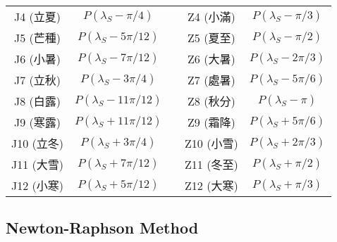 \documentclass[12pt]{article}
\begin{document}
\begin{CJK}{UTF8}{bkai}
\begin{tabular}{cc|c|cc}
  J4 (立夏) & $P(\lambda_S - \pi/4)$ & & Z4 (小滿) & $P(\lambda_S - \pi/3)$ \\
  J5 (芒種) & $P(\lambda_S - 5\pi/12)$ & & Z5 (夏至) & $P(\lambda_S - \pi/2)$ \\ 
  J6 (小暑) & $P(\lambda_S - 7\pi/12)$ & & Z6 (大暑) & $P(\lambda_S - 2\pi/3)$ \\
  J7 (立秋) & $P(\lambda_S - 3\pi/4)$ & & Z7 (處暑) & $P(\lambda_S - 5\pi/6)$ \\
  J8 (白露) & $P(\lambda_S - 11\pi/12)$ & & Z8 (秋分) & $P(\lambda_S - \pi)$ \\ 
  J9 (寒露) & $P(\lambda_S + 11\pi/12)$ & & Z9 (霜降) & $P(\lambda_S + 5\pi/6)$ \\
  J10 (立冬) & $P(\lambda_S + 3\pi/4)$ & & Z10 (小雪) & $P(\lambda_S + 2\pi/3)$ \\
  J11 (大雪) & $P(\lambda_S + 7\pi/12)$ & & Z11 (冬至) & $P(\lambda_S + \pi/2)$ \\ 
  J12 (小寒) & $P(\lambda_S + 5\pi/12)$ & & Z12 (大寒) & $P(\lambda_S + \pi/3)$ \\
\hline
\end{tabular}

\subsection{Newton-Raphson Method}


\end{CJK}
\end{document}
